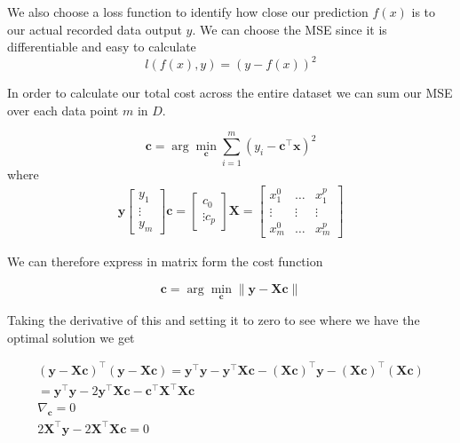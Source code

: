\documentclass[11pt]{article}
\begin{document}
We also choose a loss function to identify how close our prediction $f(x)$ is to our actual recorded data output $y$.
We can choose the MSE since it is differentiable and easy to calculate
\begin{equation}
    l(f(x),y) = (y-f(x))^2
\end{equation}

In order to calculate our total cost across the entire dataset we can sum our MSE over each data point $m$ in $D$.

\begin{equation}
    \textbf{c} = \arg \min_\textbf{c} \sum_{i=1}^{m} (y_i - \textbf{c}^\top \textbf{x})^2
\end{equation}
where
\begin{align}
    \textbf{y}
  \begin{bmatrix}
    y_1 \\ \vdots \\ y_m 
  \end{bmatrix}
  \textbf{c} = 
  \begin{bmatrix}
    c_0 \\ \vdots c_p
  \end{bmatrix}
  \textbf{X} = 
  \begin{bmatrix}
    x_1^0 & \dots & x_1^p \\
    \vdots & \vdots & \vdots \\
    x_m^0 & \dots & x_m^p
  \end{bmatrix}
\end{align}

We can therefore express in matrix form the cost function

\begin{equation}
    \textbf{c} = \arg \min_\textbf{c} \| \textbf{y} - \textbf{X} \textbf{c} \|
\end{equation}

Taking the derivative of this and setting it to zero to see where we have the optimal solution we get

\begin{gather}
    (\textbf{y} - \textbf{X} \textbf{c})^\top (\textbf{y} - \textbf{X} \textbf{c}) = \textbf{y}^\top \textbf{y} - \textbf{y}^\top \textbf{X} \textbf{c} - (\textbf{X} \textbf{c})^\top \textbf{y} - (\textbf{X} \textbf{c})^\top (\textbf{X} \textbf{c}) \\
    = \textbf{y}^\top \textbf{y} - 2 \textbf{y}^\top \textbf{X} \textbf{c} - \textbf{c}^\top \textbf{X}^\top \textbf{X} \textbf{c} \\
    \nabla_\textbf{c} = 0 \\
    2 \textbf{X}^\top \textbf{y} - 2 \textbf{X}^\top \textbf{X}  \textbf{c} = 0
\end{gather}
\end{document}
